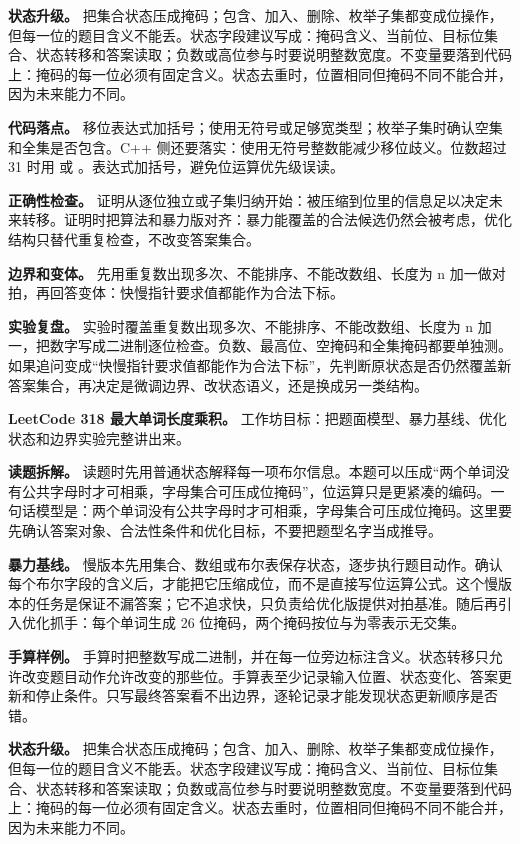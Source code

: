 \textbf{状态升级。} 把集合状态压成掩码；包含、加入、删除、枚举子集都变成位操作，但每一位的题目含义不能丢。状态字段建议写成：掩码含义、当前位、目标位集合、状态转移和答案读取；负数或高位参与时要说明整数宽度。不变量要落到代码上：掩码的每一位必须有固定含义。状态去重时，位置相同但掩码不同不能合并，因为未来能力不同。

\textbf{代码落点。} 移位表达式加括号；使用无符号或足够宽类型；枚举子集时确认空集和全集是否包含。C++ 侧还要落实：使用无符号整数能减少移位歧义。位数超过 31 时用  或 。表达式加括号，避免位运算优先级误读。

\textbf{正确性检查。} 证明从逐位独立或子集归纳开始：被压缩到位里的信息足以决定未来转移。证明时把算法和暴力版对齐：暴力能覆盖的合法候选仍然会被考虑，优化结构只替代重复检查，不改变答案集合。

\textbf{边界和变体。} 先用重复数出现多次、不能排序、不能改数组、长度为 n 加一做对拍，再回答变体：快慢指针要求值都能作为合法下标。

\textbf{实验复盘。} 实验时覆盖重复数出现多次、不能排序、不能改数组、长度为 n 加一，把数字写成二进制逐位检查。负数、最高位、空掩码和全集掩码都要单独测。如果追问变成“快慢指针要求值都能作为合法下标”，先判断原状态是否仍然覆盖新答案集合，再决定是微调边界、改状态语义，还是换成另一类结构。

\noindent\textbf{LeetCode 318 最大单词长度乘积。} 工作坊目标：把题面模型、暴力基线、优化状态和边界实验完整讲出来。

\textbf{读题拆解。} 读题时先用普通状态解释每一项布尔信息。本题可以压成“两个单词没有公共字母时才可相乘，字母集合可压成位掩码”，位运算只是更紧凑的编码。一句话模型是：两个单词没有公共字母时才可相乘，字母集合可压成位掩码。这里要先确认答案对象、合法性条件和优化目标，不要把题型名字当成推导。

\textbf{暴力基线。} 慢版本先用集合、数组或布尔表保存状态，逐步执行题目动作。确认每个布尔字段的含义后，才能把它压缩成位，而不是直接写位运算公式。这个慢版本的任务是保证不漏答案；它不追求快，只负责给优化版提供对拍基准。随后再引入优化抓手：每个单词生成 26 位掩码，两个掩码按位与为零表示无交集。

\textbf{手算样例。} 手算时把整数写成二进制，并在每一位旁边标注含义。状态转移只允许改变题目动作允许改变的那些位。手算表至少记录输入位置、状态变化、答案更新和停止条件。只写最终答案看不出边界，逐轮记录才能发现状态更新顺序是否错。

\textbf{状态升级。} 把集合状态压成掩码；包含、加入、删除、枚举子集都变成位操作，但每一位的题目含义不能丢。状态字段建议写成：掩码含义、当前位、目标位集合、状态转移和答案读取；负数或高位参与时要说明整数宽度。不变量要落到代码上：掩码的每一位必须有固定含义。状态去重时，位置相同但掩码不同不能合并，因为未来能力不同。

